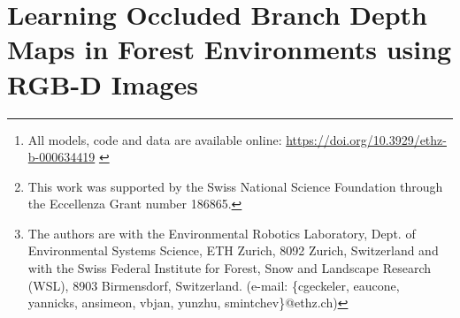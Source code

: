 \chapter{Learning Occluded Branch Depth Maps in Forest Environments using RGB-D Images}
\label{ch:OBR}

\author{
Christian~Geckeler,
Emanuele~Aucone,
Yannick~Schnider,
Andri~Simeon,\\
Jan-Philipp~von~Bassewitz,
Yunying~Zhu,
and Stefano~Mintchev%
\thanks{This work was supported by the Swiss National Science Foundation through the Eccellenza Grant number 186865.}%
\thanks{The authors are with the Environmental Robotics Laboratory, Dept. of Environmental Systems Science, ETH Zurich, 8092 Zurich, Switzerland and with the Swiss Federal Institute for Forest, Snow and Landscape Research (WSL), 8903 Birmensdorf, Switzerland. (e-mail: \{cgeckeler, eaucone, yannicks, ansimeon, vbjan, yunzhu, smintchev\}@ethz.ch)}%
}

\begin{abstract}
Covering over a third of all terrestrial land area, forests are crucial environments; as ecosystems, for farming, and for human leisure. However, they are challenging to access for environmental monitoring, for agricultural uses, and for search and rescue applications. To enter, aerial robots need to fly through dense vegetation, where foliage can be pushed aside, but occluded branches pose critical obstacles. Therefore, we propose pixel-wise depth regression of occluded branches using three different U-Net inspired architectures. Given \mbox{RGB-D} input of trees with partially occluded branches, the models estimate depth values of only the wooden parts of the tree. A large photorealistic simulation dataset comprising around 44K images of nine different tree species is generated, on which the models are trained. Extensive evaluation and analysis of the models on this dataset is shown. To improve network generalization to real-world data, different data augmentation and transformation techniques are performed. The approaches are then also successfully demonstrated on real-world data of broadleaf trees from Swiss temperate forests and a tropical Masoala Rainforest. This work showcases the previously unexplored task of frame-by-frame pixel-based occluded branch depth reconstruction to facilitate robot traversal of forest environments.
All models, code, and data are available online. \cite{Geckeler2023OBRSupplementary}\footnote{All models, code and data are available online: \href{https://doi.org/10.3929/ethz-b-000634419}{https://doi.org/10.3929/ethz-b-000634419} \cite{Geckeler2023OBRSupplementary}}
\end{abstract}

